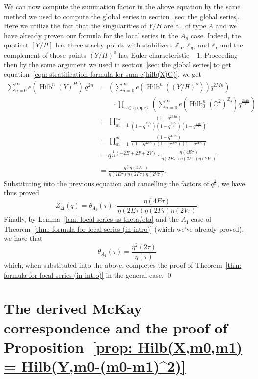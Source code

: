 \documentclass{amsart}
\theoremstyle{definition}
\newcommand{\CC} {{\mathbb C}}          %
\newcommand{\ZZ} {{\mathbb Z}}		%
\newcommand{\varp}{\mathsf{p}}
\newcommand{\varq}{\mathsf{q}}
\newcommand{\varr}{\mathsf{r}}
\newcommand{\vara}{\mathsf{a}}
\newcommand{\Hilb}{\operatorname{Hilb}}
\begin{document}
We can now compute the summation factor in the above equation by the
same method we used to compute the global series in section~\ref{sec:
the global series}. Here we utilize the fact that the singularities of
$Y/H$ are all of type $A$ and we have already proven our formula for
the local series in the $A_{n}$ case. Indeed, the quotient $[Y/H]$ has
three stacky points with stabilizers $\ZZ_{\varp}$, $\ZZ_{\varq}$, and
$\ZZ_{\varr}$ and the complement of those points $(Y/H)^{o}$ has Euler
characteristic $-1$. Proceeding then by the same argument we used in
section~\ref{sec: the global series} to get equation~\eqref{eqn:
stratification formula for sum e(hilb(X)G)}, we get
\begin{align*}
\sum_{n=0}^{\infty}  e\left(\Hilb^{n}(Y)^{H}\right)\, q^{2n}&=
\left(\sum_{n=0}^{\infty} e\left(\Hilb^{n}\left((Y/H)^{o} \right)
\right) q^{2Mn} \right)  \\
&\quad \quad  \cdot \prod_{\vara \in \{\varp ,\varq
,\varr  \}}\, \left( \sum_{n=0}^{\infty} e\left(\Hilb_{0}^{n}(\CC^{2})^{\ZZ_{\vara }} \right) q^{\frac{2Mn}{\vara }}  \right)\\
&=\prod_{m=1}^{\infty} \frac{\left(1-q^{2Mn} \right)}{\left(1-q^{\frac{2Mn}{\varp}} \right)\left(1-q^{\frac{2Mn}{\varq}} \right)\left(1-q^{\frac{2Mn}{\varr}} \right)}\\
&=\prod_{m=1}^{\infty} \frac{\left(1-q^{4En} \right)}{\left(1-q^{2En} \right)\left(1-q^{2Fn} \right)\left(1-q^{2Vn} \right)}\\
&=q^{\frac{1}{24}(-2E+2F+2V)}\cdot  \frac{\eta (4E\tau )}{\eta (2E\tau )\eta
(2F\tau )\eta (2V\tau )} \\
&=  \frac{q^{\frac{1}{6}}\,\eta (4E\tau )}{\eta (2E\tau )\eta
(2F\tau )\eta (2V\tau )}.
\end{align*}
Substituting into the previous equation and cancelling the factors of
$q^{\frac{1}{6}}$, we have thus proved
\[
Z_{\Delta}(q) = \theta_{A_{1}}(\tau )\cdot \frac{\eta (4E\tau )}{\eta
(2E\tau )\eta (2F\tau )\eta (2V\tau )}.
\]
Finally, by Lemma~\ref{lem: local series as theta/eta} and the $A_{1}$
case of Theorem~\ref{thm: formula for local series (in intro)} (which
we've already proved), we have that 
\[
\theta_{A_{1}}(\tau ) =\frac{\eta^{2}(2\tau )}{\eta (\tau )}
\]
which, when substituted into the above, completes the proof of
Theorem~\ref{thm: formula for local series (in intro)} in the general
case. \qed 



\section{The derived McKay correspondence and the proof of
Proposition~\ref{prop: Hilb(X,m0,m1) =
Hilb(Y,m0-(m0-m1)^2)}}\label{sec: McKay correspondence}
\end{document}

